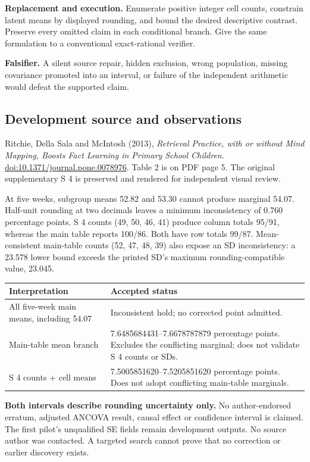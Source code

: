 \documentclass[10pt]{article}
\begin{document}
\textbf{Replacement and execution.} Enumerate positive integer cell counts, constrain latent means by displayed rounding, and bound the desired descriptive contrast. Preserve every omitted claim in each conditional branch. Give the same formulation to a conventional exact-rational verifier.

\textbf{Falsifier.} A silent source repair, hidden exclusion, wrong population, missing covariance promoted into an interval, or failure of the independent arithmetic would defeat the supported claim.

\subsection*{Development source and observations}

Ritchie, Della Sala and McIntosh (2013), \emph{Retrieval Practice, with or without Mind Mapping, Boosts Fact Learning in Primary School Children}. \href{https://doi.org/10.1371/journal.pone.0078976}{doi:10.1371/journal.pone.0078976}. Table 2 is on PDF page 5. The original supplementary S 4 is preserved and rendered for independent visual review.

At five weeks, subgroup means 52.82 and 53.30 cannot produce marginal 54.07. Half-unit rounding at two decimals leaves a minimum inconsistency of 0.760 percentage points. S 4 counts (49, 50, 46, 41) produce column totals 95/91, whereas the main table reports 100/86. Both have row totals 99/87. Mean-consistent main-table counts (52, 47, 48, 39) also expose an SD inconsistency: a 23.578 lower bound exceeds the printed SD's maximum rounding-compatible value, 23.045.

\begin{tabularx}{\textwidth}{p{}Y}
\toprule Interpretation & Accepted status\\\midrule
All five-week main means, including 54.07 & Inconsistent hold; no corrected point admitted.\\
Main-table mean branch & 7.6485684431--7.6678787879 percentage points. Excludes the conflicting marginal; does not validate S 4 counts or SDs.\\
S 4 counts + cell means & 7.5005851620--7.5205851620 percentage points. Does not adopt conflicting main-table marginals.\\\bottomrule
\end{tabularx}

\textbf{Both intervals describe rounding uncertainty only.} No author-endorsed erratum, adjusted ANCOVA result, causal effect or confidence interval is claimed. The first pilot's unqualified SE fields remain development outputs. No source author was contacted. A targeted search cannot prove that no correction or earlier discovery exists.
\end{document}
